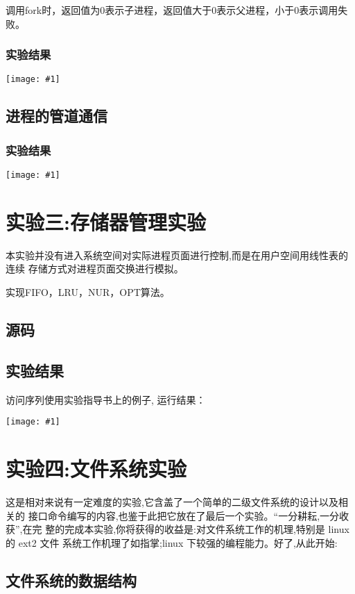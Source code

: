 \documentclass{article}
\newcommand{\incpng}[1]{\texttt{[image: \#1]}}
\begin{document}
\begin{CJK}{UTF8}{gkai}
调用fork时，返回值为0表示子进程，返回值大于0表示父进程，小于0表示调用失败。


\subsubsection{实验结果}

\incpng{../ac}

\subsection{进程的管道通信}



\subsubsection{实验结果}

\incpng{../bc}

\clearpage
\section{实验三:存储器管理实验}
本实验并没有进入系统空间对实际进程页面进行控制,而是在用户空间用线性表的连续
存储方式对进程页面交换进行模拟。

实现FIFO，LRU，NUR，OPT算法。

\subsection{源码}


\subsection{实验结果}
访问序列使用实验指导书上的例子, 运行结果：

\incpng{../page}

\clearpage
\section{实验四:文件系统实验}
这是相对来说有一定难度的实验,它含盖了一个简单的二级文件系统的设计以及相关的
接口命令编写的内容,也鉴于此把它放在了最后一个实验。“一分耕耘,一分收获”,在完
整的完成本实验,你将获得的收益是:对文件系统工作的机理,特别是 linux 的 ext2 文件
系统工作机理了如指掌;linux 下较强的编程能力。好了,从此开始:

\subsection{文件系统的数据结构}

\end{CJK}
\end{document}
